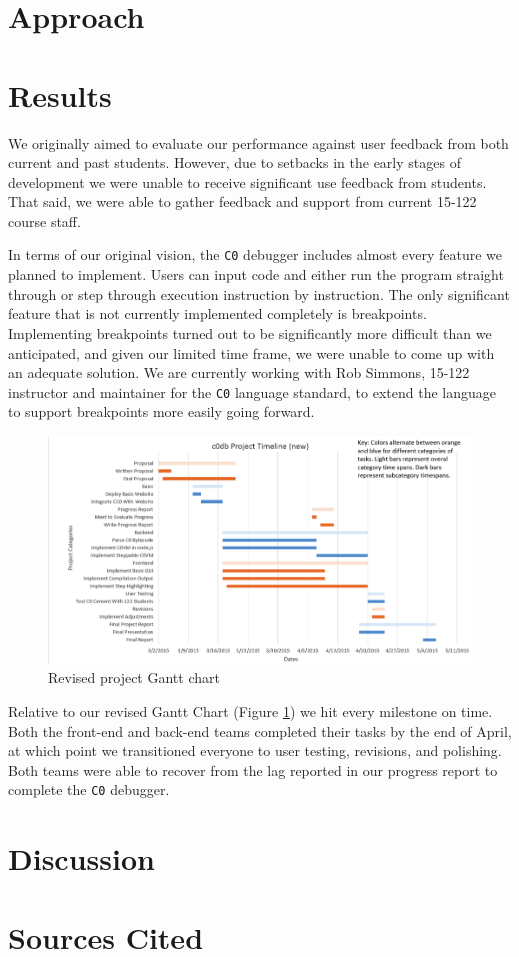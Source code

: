 \documentclass[11pt]{article}
\begin{document}
\section{Approach}

\section{Results}
\par
We originally aimed to evaluate our performance against user feedback from both
current and past students. However, due to setbacks in the early stages of
development we were unable to receive significant use feedback from students.
That said, we were able to gather feedback and support from current 15-122
course staff.

In terms of our original vision, the {\tt C0} debugger includes almost every
feature we planned to implement. Users can input code and either run the program
straight through or step through execution instruction by instruction. The only
significant feature that is not currently implemented completely is breakpoints.
Implementing breakpoints turned out to be significantly more difficult than we
anticipated, and given our limited time frame, we were unable to come up with an
adequate solution. We are currently working with Rob Simmons, 15-122 instructor
and maintainer for the {\tt C0} language standard, to extend the language to
support breakpoints more easily going forward.

\begin{figure}[h]
  \includegraphics[width=\linewidth]{new-gantt}
  \caption{Revised project Gantt chart}
  \label{gantt}
\end{figure}
Relative to our revised Gantt Chart (Figure \ref{gantt}) we hit every milestone
on time. Both the front-end and back-end teams completed their tasks by the end
of April, at which point we transitioned everyone to user testing, revisions,
and polishing. Both teams were able to recover from the lag reported in our
progress report to complete the {\tt C0} debugger.

\section{Discussion}

\section{Sources Cited}
\end{document}
